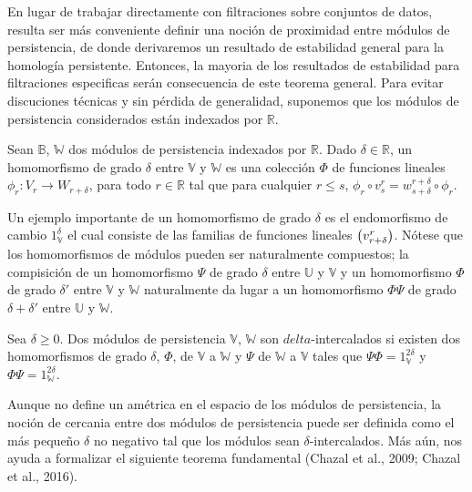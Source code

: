 En lugar de trabajar directamente con filtraciones sobre conjuntos de datos,
resulta ser m\'as conveniente definir una noci\'on de proximidad entre m\'odulos
de persistencia, de donde derivaremos un resultado de estabilidad general para la
homolog\'ia persistente. Entonces, la mayoria de los resultados de estabilidad
para filtraciones especificas ser\'an consecuencia de este teorema general.
Para evitar discuciones t\'ecnicas y sin p\'erdida de generalidad, suponemos
que los m\'odulos de persistencia considerados est\'an indexados por $\mathbb{R}$.

\begin{definicion}
    Sean $\mathbb{B}$, $\mathbb{W}$ dos m\'odulos de persistencia indexados por
    $\mathbb{R}$. Dado $\delta\in\mathbb{R}$, un homomorfismo de grado $\delta$ entre
    $\mathbb{V}$ y $\mathbb{W}$ es una colecci\'on $\Phi$ de funciones lineales
    $\phi_{r}:V_{r}\rightarrow W_{r+\delta}$, para todo $r\in\mathbb{R}$ tal que
    para cualquier $r\leq s$, $\phi_{r}\circ v_{s}^{r}=w_{s+\delta}^{r+\delta}\circ\phi_{r}$.
\end{definicion}

Un ejemplo importante de un homomorfismo de grado $\delta$ es el endomorfismo de cambio
$\mathrm{1}_{\mathbb{V}}^{\delta}$ el cual consiste de las familias de funciones lineales
$\left(v_{r+\delta}^{r}\right)$. N\'otese que los homomorfismos de m\'odulos pueden ser
naturalmente compuestos; la compisici\'on de un homomorfismo $\Psi$ de grado $\delta$
entre $\mathbb{U}$ y $\mathbb{V}$ y un homomorfismo $\Phi$ de grado $\delta'$ entre
$\mathbb{V}$ y $\mathbb{W}$ naturalmente da lugar a un homomorfismo $\Phi\Psi$ de
grado $\delta + \delta'$ entre $\mathbb{U}$ y $\mathbb{W}$.

\begin{definicion}
    Sea $\delta\geq 0$. Dos m\'odulos de persistencia $\mathbb{V}$, $\mathbb{W}$
    son $delta$-intercalados si existen dos homomorfismos de grado $\delta$,
    $\Phi$, de $\mathbb{V}$ a $\mathbb{W}$ y $\Psi$ de $\mathbb{W}$ a $\mathbb{V}$
    tales que $\Psi\Phi = \mathrm{1}_{\mathbb{V}}^{2\delta}$ y
    $\Phi\Psi = \mathrm{1}_{\mathbb{W}}^{2\delta}$.
\end{definicion}

Aunque no define un am\'etrica en el espacio de los m\'odulos de persistencia,
la noci\'on de cercania entre dos m\'odulos de persistencia puede ser definida como
el m\'as peque\~{n}o $\delta$ no negativo tal que los m\'odulos sean $\delta$-intercalados.
M\'as a\'un, nos ayuda a formalizar el siguiente teorema fundamental
(Chazal et al., 2009\cite{Chazal2009a}; Chazal et al., 2016\cite{Chazal2016a}).

